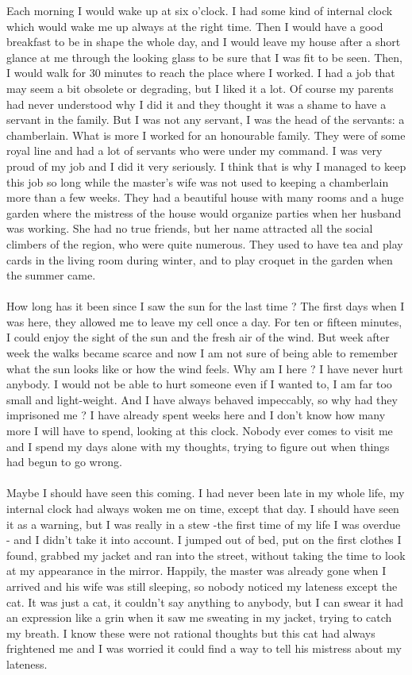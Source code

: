 \documentclass[a4paper]{article}
\begin{document}
Each morning I would wake up at six o'clock. I had some kind of internal clock which would wake me up always at the right time. Then I would have a good breakfast to be in shape the whole day, and I would leave my house after a short glance at me through the looking glass to be sure that I was fit to be seen. Then, I would walk for 30 minutes to reach the place where I worked. I had a job that may seem a bit obsolete or degrading, but I liked it a lot. Of course my parents had never understood why I did it and they thought it was a shame to have a servant in the family. But I was not any servant, I was the head of the servants: a chamberlain. What is more I worked for an honourable family. They were of some royal line and had a lot of servants who were under my command. I was very proud of my job and I did it very seriously. I think that is why I managed to keep this job so long while the master's wife was not used to keeping a chamberlain more than a few weeks. They had a beautiful house with many rooms and a huge garden where the mistress of the house would organize parties when her husband was working. She had no true friends, but her name attracted all the social climbers of the region, who were quite numerous. They used to have tea and play cards in the living room during winter, and to play croquet in the garden when the summer came.\\
\\
How long has it been since I saw the sun for the last time ? The first days when I was here, they allowed me to leave my cell once a day. For ten or fifteen minutes, I could enjoy the sight of the sun and the fresh air of the wind. But week after week the walks became scarce and now I am not sure of being able to remember what the sun looks like or how the wind feels. Why am I here ? I have never hurt anybody. I would not be able to hurt someone even if I wanted to, I am far too small and light-weight. And I have always behaved impeccably, so why had they imprisoned me ? I have already spent weeks here and I don't know how many more I will have to spend, looking at this clock. Nobody ever comes to visit me and I spend my days alone with my thoughts, trying to figure out when things had begun to go wrong.\\
\\
Maybe I should have seen this coming. I had never been late in my whole life, my internal clock had always woken me on time, except that day. I should have seen it as a warning, but I was really in a stew -the first time of my life I was overdue - and I didn't take it into account. I jumped out of bed, put on the first clothes I found, grabbed my jacket and ran into the street, without taking the time to look at my appearance in the mirror. Happily, the master was already gone when I arrived and his wife was still sleeping, so nobody noticed my lateness except the cat. It was just a cat, it couldn't say anything to anybody, but I can swear it had an expression like a grin when it saw me sweating in my jacket, trying to catch my breath. I know these were not rational thoughts but this cat had always frightened me and I was worried it could find a way to tell his mistress about my lateness.\\
\end{document}
